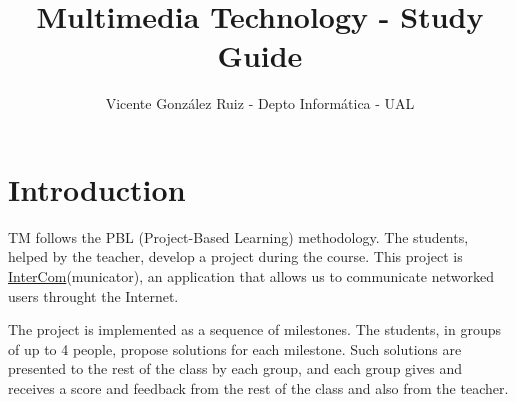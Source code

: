 \title{Multimedia Technology - Study Guide}
\author{Vicente González Ruiz - Depto Informática - UAL}

\maketitle
\tableofcontents

\section{Introduction}
TM follows the PBL (Project-Based Learning) methodology. The students,
helped by the teacher, develop a project during the course. This
project
is \href{https://github.com/Tecnologias-multimedia/intercom}{InterCom}(municator),
an application that allows us to communicate networked users throught
the Internet.

The project is implemented as a sequence of milestones. The students,
in groups of up to 4 people, propose solutions for each
milestone. Such solutions are presented to the rest of the class by
each group, and each group gives and receives a score and feedback
from the rest of the class and also from the teacher.

